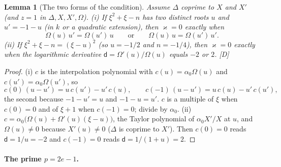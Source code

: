 \documentclass[11pt]{article}
\newtheorem{lemma}{Lemma}
\theoremstyle{definition}
\theoremstyle{remark}
\begin{document}
\begin{lemma}[The two forms of the condition]\label{lem:exptexpl}
Assume $\Delta$ coprime to $X$ and $X'$ (and $z=1$ in $\Delta,X,X',\Omega$). (i) If $\xi^2+\xi-n$ has two distinct roots $u$ and $u'=-1-u$ (in $k$ or a quadratic extension), then $\varkappa=0$ exactly when
\[
\Omega(u)\,u'=\Omega(u')\,u\qquad\text{or}\qquad\Omega(u)\,u=\Omega(u')\,u'.
\]
(ii) If $\xi^2+\xi-n=(\xi-u)^2$ (so $u=-1/2$ and $n=-1/4$), then $\varkappa=0$ exactly when the logarithmic derivative $\mathsf d=\Omega'(u)/\Omega(u)$ equals $-2$ or $2$. [D]
\end{lemma}
\begin{proof}
(i) $c$ is the interpolation polynomial with $c(u)=\alpha_0\Omega(u)$ and $c(u')=\alpha_0\Omega(u')$, so
\[
c(0)\,(u-u')=u\,c(u')-u'\,c(u),\qquad c(-1)\,(u-u')=u\,c(u)-u'\,c(u'),
\]
the second because $-1-u'=u$ and $-1-u=u'$. $c$ is a multiple of $\xi$ when $c(0)=0$ and of $\xi+1$ when $c(-1)=0$; divide by $\alpha_0$. (ii) $c=\alpha_0\bigl(\Omega(u)+\Omega'(u)(\xi-u)\bigr)$, the Taylor polynomial of $\alpha_0X'/X$ at $u$, and $\Omega(u)\ne0$ because $X'(u)\ne0$ ($\Delta$ is coprime to $X'$). Then $c(0)=0$ reads $\mathsf d=1/u=-2$ and $c(-1)=0$ reads $\mathsf d=1/(1+u)=2$.
\end{proof}

\paragraph{The prime $p=2e-1$.}
\end{document}
